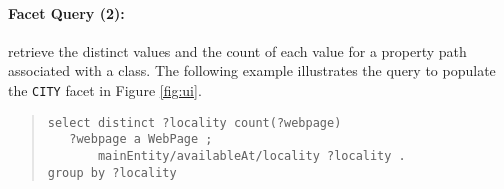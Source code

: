 \paragraph{Facet Query (2):} retrieve the distinct values and the count of each value for a property path associated with a class.
The following example illustrates the query to populate the \verb|CITY| facet in Figure \ref{fig:ui}.
\begin{quote}
{\footnotesize
\begin{verbatim}
select distinct ?locality count(?webpage)
   ?webpage a WebPage ;
       mainEntity/availableAt/locality ?locality .
group by ?locality
\end{verbatim}}
\end{quote}
